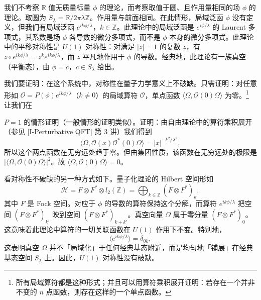 我们不考察 $\mathbb{R}$ 值无质量标量 $\phi$ 的理论，而考察取值于圆、且作用量相同的场 $\phi$ 的理论。取圆为 $S_\lambda=\mathbb{R}/2\pi\lambda\mathbb{Z}$。作用量与前面相同。在此情形，局域泛函 $\phi$ 没有定义，但我们有局域泛函 $e^{ik\phi/\lambda}$，$k\in\mathbb{Z}$。此理论中的局域泛函是 $e^{i\phi/\lambda}$ 的 Laurent 多项式，其系数是场 $\phi$ 各导数的微分多项式，而不是 $\phi$ 本身的微分多项式。此理论中的平移对称性是 $U(1)$ 对称性：对满足 $|z|=1$ 的复数 $z$，有 $z\circ e^{ik\phi/\lambda}=z^k e^{ik\phi/\lambda}$，而 $z$ 平凡地作用于 $\phi$ 的导数。经典地，此理论有一族真空（平衡态），由 $\phi=c$，$c\in S_\lambda$ 给出。

我们要证明：在这个系统中，对称性在量子力学意义上不破缺。只需证明：对任意形如 $\mathcal{O}=P(\phi)e^{ik\phi/\lambda}$（$k\neq0$）的局域算符 $\mathcal{O}$，单点函数 $\langle\Omega,\mathcal{O}(0)\Omega\rangle$ 为零。\footnote{所有局域算符都是这种形式；并且可以用算符乘积展开证明：若存在一个并非不变的 $n$ 点函数，则存在这样的一个单点函数。} 让我们在

$P=1$ 的情形证明（一般情形的证明类似）。证明：由自由理论中的算符乘积展开（参见 [I-Perturbative QFT] 第 3 讲）我们得到
\[
\langle\Omega,\mathcal{O}(x)\mathcal{O}^*(0)\Omega\rangle=|x|^{-k^2/\lambda^2},
\]
所以这个两点函数在无穷远处趋于零。但由集团性质，该函数在无穷远处的极限是 $|\langle\Omega,\mathcal{O}(0)\Omega\rangle|^2$。故 $\langle\Omega,\mathcal{O}(0)\Omega\rangle=0$。

看对称性不破缺的另一种方式如下。量子化理论的 Hilbert 空间形如
\[
\mathcal{H}=F\otimes F^*\otimes l_2(\mathbb{Z})=\bigoplus_{k\in\mathbb{Z}}(F\otimes F^*)_k,
\]
其中 $F$ 是 Fock 空间。对应于 $\phi$ 的导数的算符保持这个分解，而算符 $e^{ik\phi/\lambda}$ 把空间 $(F\otimes F^*)_{k'}$ 映到空间 $(F\otimes F^*)_{k+k'}$。真空向量 $\Omega$ 属于零分量 $(F\otimes F^*)_0$。这意味着此理论中算符的一切关联函数在 $U(1)$ 作用下不变。特别地，
\[
\langle e^{ik\phi/\lambda}\rangle=\delta_{0k},
\]
这表明真空 $\Omega$ 并不「局域化」于任何经典基态附近，而是均匀地「铺展」在经典基态空间 $S_\lambda$ 上。因此，$U(1)$ 对称性没有破缺。



